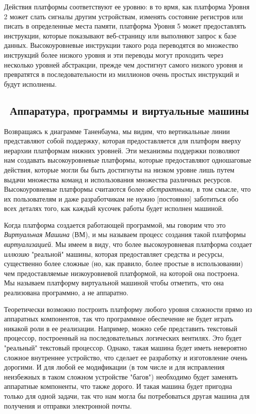 Действия платформы соответствуют ее уровню: в то врмя, как платформа Уровня 2 может слать сигналы другим устройствам, изменять состояние регистров или писать в определенные места памяти, платформа Уровня 5 может предоставлять инструкции, которые показывают веб-страницу или выполняют запрос к базе данных.  Высокоуровневые инструкции такого рода переводятся во множество инструкций более низкого уровня и эти переводы могут проходить через несколько уровней абстракции, прежде чем достигнут самого низкого уровня и превратятся в последовательности из миллионов очень простых инструкций и будут исполнены.

\subsection{ Аппаратура, программы и виртуальные машины}

Возвращаясь к диаграмме Таненбаума, мы видим, что вертикальные линии представляют собой поддержку, которая предоставляется для платформ вверху иерархии платформам нижних уровней. Эти механизмы поддержки позволяют нам создавать высокоуровневые платформы, которые предоставляют одношаговые действия, которые могли бы быть достигнуты на низком уровне лишь путем выдачи множества команд и использования множества различных ресурсов.  Высокоуровневые платформы считаются более \emph{абстрактными}, в том смысле, что их пользователям и даже разработчикам не нужно [постоянно] заботиться обо всех деталях того, как каждый кусочек работы будет исполнен машиной.

Когда платформа создается работающей программой, мы говорим что это \emph{Виртуальная Машина} (ВМ), и мы называем процесс создания такой платформы \emph{виртуализацией}. Мы имеем в виду, что более высокоуровневая платформа создает \emph{иллюзию} "реальной" машины, которая предоставляет средства и ресурсы, существенно более сложные (но, как правило, более простые в использовании) чем предоставляемые низкоуровневой платформой, на которой она построена.  Мы называем платформу виртуальной машиной чтобы отметить, что она реализована программно, а не аппаратно.

Теоретически возможно построить платформу любого уровня сложности прямо из аппаратных компонентов, так что программное обеспечение не будет играть никакой роли в ее реализации.  Например, можно себе представить текстовый процессор, построенный на последовательных логических вентилях.  Это будет "реальный" текстовый процессор.  Однако, такая машина будет иметь невероятно сложное внутреннее устройство, что сделает ее разработку и изготовление очень дорогими.  И для любой ее модификации (в том числе и для исправления неизбежных в таком сложном устройстве "багов") необходимо будет заменять аппаратные компоненты, что также дорого.  И такая машина будет пригодна только для одной задачи, так что нам могла бы потребоваться другая машина для получения и отправки электронной почты.

